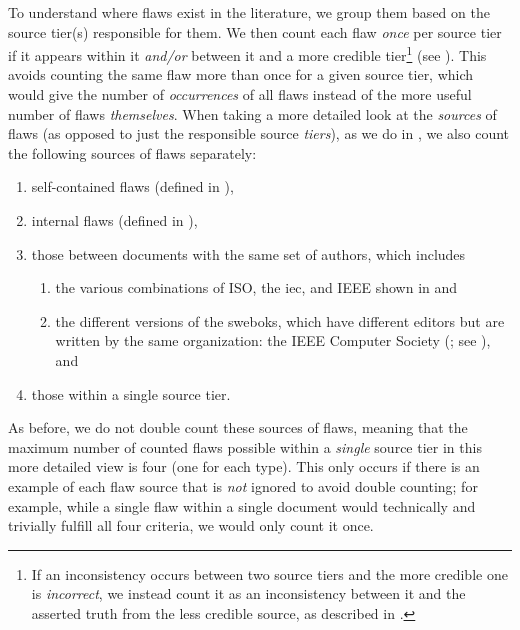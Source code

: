 \label{flaw-cred-compare}
To understand where flaws exist in the literature, we group them based on the
source tier(s) responsible for them. We then count each flaw \emph{once} per
source tier if it appears within it \emph{and/or} between it and a more
credible tier\footnote{If an inconsistency occurs between two source tiers
    and the more credible one is \emph{incorrect}, we instead count it as an
    inconsistency between it and the asserted truth from the less credible
    source, as described in .} (see ). This avoids counting the same flaw
more than once for a given source tier, which would give the
number of \emph{occurrences} of all flaws instead of the more useful number of
flaws \emph{themselves}. When taking a more detailed look at the \emph{sources}
of flaws (as opposed to just the responsible source \emph{tiers}), as we do in
, we also count the following sources of flaws separately:
\begin{enumerate}
    \item self-contained flaws (defined in ),
    \item internal flaws (defined in ),
    \item those between documents with the same set of authors, which includes
          \begin{enumerate}
              \item the various combinations of ISO, the \acf{iec}, and IEEE
                    shown in  and
              \item the different versions of the \acfp{swebok}, which have
                    different editors \citep{SWEBOK2024,SWEBOK2014} but are
                    written by the same organization: the IEEE Computer Society
                    (\citealp{AboutSWEBOK}; see ), and
          \end{enumerate}
    \item those within a single source tier.
\end{enumerate}
As before, we do not double count these sources of flaws, meaning that the
maximum number of counted flaws possible within a \emph{single} source tier in
this more detailed view is four (one for each type). This only occurs if there
is an example of each flaw source that is \emph{not} ignored to avoid double
counting; for example, while a single flaw within a single document would
technically and trivially fulfill all four criteria, we would only count it
once.

